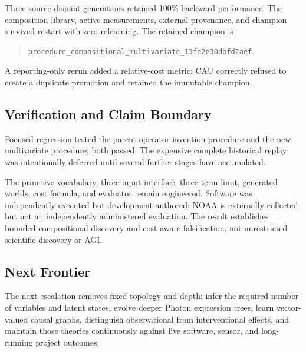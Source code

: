 Three source-disjoint generations retained 100\% backward performance. The
composition library, active measurements, external provenance, and champion
survived restart with zero relearning. The retained champion is
\begin{quote}
\texttt{procedure\_compositional\_multivariate\_13fe2e30dbfd2aef}.
\end{quote}
A reporting-only rerun added a relative-cost metric; CAU correctly refused to
create a duplicate promotion and retained the immutable champion.

\subsection{Verification and Claim Boundary}

Focused regression tested the parent operator-invention procedure and the new
multivariate procedure; both passed. The expensive complete historical replay
was intentionally deferred until several further stages have accumulated.

The primitive vocabulary, three-input interface, three-term limit, generated
worlds, cost formula, and evaluator remain engineered. Software was independently
executed but development-authored; NOAA is externally collected but not an
independently administered evaluation. The result establishes bounded
compositional discovery and cost-aware falsification, not unrestricted
scientific discovery or AGI.

\subsection{Next Frontier}

The next escalation removes fixed topology and depth: infer the required number
of variables and latent states, evolve deeper Photon expression trees, learn
vector-valued causal graphs, distinguish observational from interventional
effects, and maintain those theories continuously against live software,
sensor, and long-running project outcomes.
